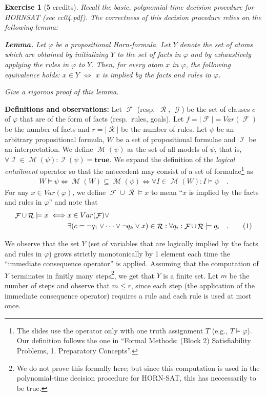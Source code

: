 \documentclass [11pt]{article}
\newtheorem{exercise}[theorem]{Exercise}
\newcommand{\LR}{\Leftrightarrow}
\renewcommand{\phi}{\varphi}
\DeclareMathOperator{\FF}{\mathcal{F}}
\DeclareMathOperator{\RR}{\mathcal{R}}
\DeclareMathOperator{\GG}{\mathcal{G}}
\DeclareMathOperator{\II}{\mathcal{I}}
\DeclareMathOperator{\MM}{\mathcal{M}}
\newcommand{\FRm}{\ensuremath{\FF \cup \RR \models}}
\newcommand{\True}{\mathbf{true}}
\newcommand\numberthis{\addtocounter{equation}{1}\tag{\theequation}}
\newcommand\neqn[1]{\numberthis\label{eqn:#1}}
\begin{document}
\noindent
\begin{exercise}[5 credits]
{\em 
Recall the basic, polynomial-time decision procedure for HORNSAT (see cc04.pdf).
The correctness of this decision procedure 
relies on the following lemma:
}%

\medskip

\noindent
{\bf Lemma.}
Let $\phi$ be a propositional Horn-formula. Let 
$Y$ denote the set of atoms which are obtained by 
initializing $Y$ to the set of facts in $\phi$ and by 
exhaustively applying the rules in $\phi$ to $Y$.
Then, for every atom $x$ in $\phi$, the following equivalence holds: 
%
$x \in Y$ $\LR$ 
$x$ is implied by the facts and rules in $\phi$.

\medskip
\noindent
{\em 
Give a rigorous proof of this lemma.
}%
\end{exercise}

\noindent
\textbf{Definitions and observations:} Let $\FF$ (resp.~$\RR$, $\GG$) be the set of clauses $c$ of $\phi$ that are of the form of facts (resp.~rules, goals).
Let $f=|\FF|=Var(\FF)$ be the number of facts and $r=|\RR|$ be the number of rules.
Let $\psi$ be an arbitrary propositional formula, $W$ be a set of propositional formulae and $\II$ be an interpretation. We define $\MM(\psi)$ as the set of all models of $\psi$, that is, $\forall \II \in \MM(\psi): \II(\psi) = \True$.
We expand the definition of the \emph{logical entailment} operator so that the antecedent may consist of a set of formulae\footnote{The slides use the operator only with one truth assignment $T$ (e.g., $T\models \phi$). Our definition follows the one in ``Formal Methods: (Block 2) Satisfiability Problems, 1. Preparatory Concepts''.} as
\begin{align*}
W \models \psi \iff \MM(W) \subseteq \MM(\psi) \iff \forall I \in \MM(W): I \models \psi \quad .
\end{align*}
For any $x \in Var(\phi)$, we define $\FRm x$ to mean ``$x$ is implied by the facts and rules in $\phi$'' and note that
\begin{align*}
\FRm x \iff & x \in Var(\FF) \lor \\
	    &\exists (c=\neg q_1 \lor \dots \lor \neg q_k \lor x)\in \RR: \forall q_i: \FRm q_i \quad . \neqn{defFRm}
\end{align*}

\noindent
We observe that the set $Y$ (set of variables that are logically implied by the facts and rules in $\phi$) grows strictly monotonically by 1 element each time the ``immediate consequence operator'' is applied. 
Assuming that the computation of $Y$ terminates in finitly many steps\footnote{We do not prove this formally here; but since this computation is used in the polynomial-time decision procedure for HORN-SAT, this has neccessarily to be true.}, we get that $Y$ is a finite set. 
Let $m$ be the number of steps and observe that $m\leq r$, since each step (the application of the immediate consequence operator) requires a rule and each rule is used at most once.
\end{document}
